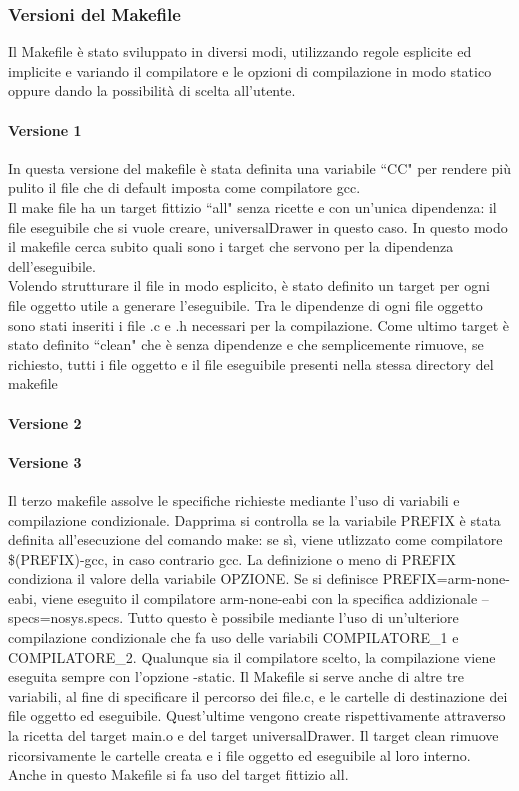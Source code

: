 \documentclass{article}
\begin{document}
	\subsubsection*{Versioni del Makefile}
		Il Makefile è stato sviluppato in diversi modi, utilizzando regole esplicite ed implicite e variando il compilatore
		e le opzioni di compilazione in modo statico oppure dando la possibilità di scelta all'utente.
		\paragraph*{Versione 1}
		In questa versione del makefile è stata definita una variabile ``CC" per rendere più pulito il file che di default imposta come compilatore gcc. \\
		Il make file ha un target fittizio ``all" senza ricette e con un'unica dipendenza: il file eseguibile che si vuole creare, universalDrawer in questo caso.
                In questo modo il makefile cerca subito quali sono i target che servono per la dipendenza dell'eseguibile. \\
		Volendo strutturare il file in modo esplicito, è stato definito un target per ogni file oggetto utile a generare l'eseguibile.
                Tra le dipendenze di ogni file oggetto sono stati inseriti i file .c e .h necessari per la compilazione.
		Come ultimo target è stato definito ``clean" che è senza dipendenze e che semplicemente rimuove, se richiesto, tutti i file oggetto e il file eseguibile presenti nella stessa directory del makefile 
		\paragraph*{Versione 2}
		\paragraph*{Versione 3}
                Il terzo makefile assolve le specifiche richieste mediante l'uso di variabili e compilazione condizionale. Dapprima si controlla se la variabile PREFIX è stata definita all'esecuzione del comando make:
                se sì, viene utlizzato come compilatore \$(PREFIX)-gcc, in caso contrario gcc. La definizione o meno di PREFIX condiziona il valore della variabile OPZIONE.
                Se si definisce PREFIX=arm-none-eabi, viene eseguito il compilatore arm-none-eabi con la specifica addizionale --specs=nosys.specs. Tutto questo è possibile mediante l'uso di un'ulteriore
                compilazione condizionale che fa uso delle variabili COMPILATORE\_1 e COMPILATORE\_2.
                Qualunque sia il compilatore scelto, la compilazione viene eseguita sempre con l'opzione -static.
                Il Makefile si serve anche di altre tre variabili, al fine di specificare il percorso dei file.c, e le cartelle di destinazione dei file oggetto ed eseguibile.
                Quest'ultime vengono create rispettivamente attraverso la ricetta del target main.o e del target universalDrawer.
                Il target clean rimuove ricorsivamente le cartelle creata e i file oggetto ed eseguibile al loro interno.
                Anche in questo Makefile si fa uso del target fittizio all.
\end{document}
